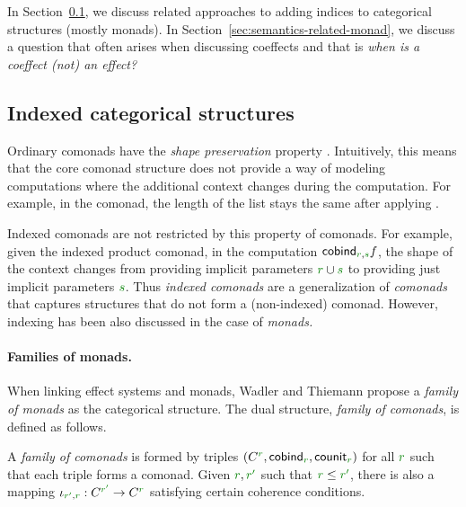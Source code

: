 In Section~\ref{sec:semantics-related-related}, we discuss related approaches to adding 
indices to categorical structures (mostly monads). In Section~\ref{sec:semantics-related-monad},
we discuss a question that often arises when discussing coeffects and that is 
\emph{when is a coeffect (not) an effect?}

\subsection{Indexed categorical structures}
\label{sec:semantics-related-related}

Ordinary comonads have the \emph{shape preservation} property \cite{comonads-codo}. Intuitively, 
this means that the core comonad structure does not provide a way of modeling computations where
the additional context changes during the computation. For example, in the  comonad, 
the length of the list stays the same after applying .

Indexed comonads are not restricted by this property of comonads. For example, given the indexed
product comonad, in the computation $\ident{cobind}_{\cclrd{r}, \cclrd{s}} f$, the shape of
the context changes from providing implicit parameters $\cclrd{r} \cup \cclrd{s}$  to providing
just implicit parameters $\cclrd{s}$. 
Thus \emph{indexed comonads} are a generalization of \emph{comonads} that captures structures that
do not form a (non-indexed) comonad. However, indexing has been also discussed in the case of
\emph{monads.}

\paragraph{Families of monads.}
When linking effect systems and monads, Wadler and Thiemann \cite{monad-notions} propose a
\emph{family of monads} as the categorical structure. The dual structure, \emph{family of
comonads}, is defined as follows.

\begin{definition}
\label{def:flat-family}
A \emph{family of comonads} is formed by triples $(\ctyp{\cclrd{r}}{}, \ident{cobind}_{\cclrd{r}}, 
  \ident{counit}_{\cclrd{r}})$ for all $\cclrd{r}$ such that each triple forms a comonad. Given 
$\cclrd{r}, \cclrd{r'}$ such that $\cclrd{r} \leq \cclrd{r'}$, there is also a mapping 
$\iota_{\cclrd{r'}, \cclrd{r}} : \ctyp{\cclrd{r'}}{} \rightarrow \ctyp{\cclrd{r}}{}$ satisfying
certain coherence conditions.
\end{definition}

